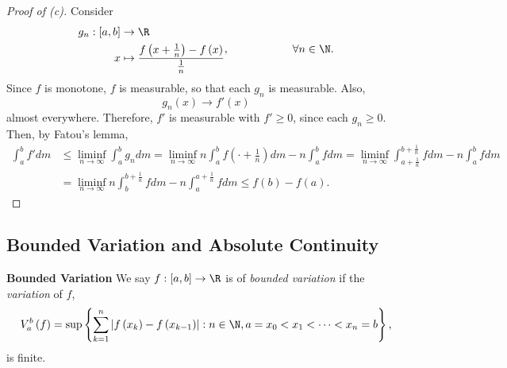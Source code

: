 \documentclass[pmath451]{subfiles}
\begin{document}
    \begin{proof}[Proof of (c)]
        Consider
        \begin{equation*}
            \begin{aligned}
                g_n:\left[ a,b \right]&\to\R \\
                x &\mapsto \frac{f\left( x+\frac{1}{n} \right)-f\left( x \right)}{\frac{1}{n}}
            \end{aligned} , \hspace{2cm}\forall n\in\N.
        \end{equation*}
        Since $f$ is monotone, $f$ is measurable, so that each $g_n$ is measurable. Also,
        \begin{equation*}
            g_n\left( x \right)\to f'\left( x \right)
        \end{equation*}
        almost everywhere. Therefore, $f'$ is measurable with $f'\geq 0$, since each $g_n\geq 0$. Then, by Fatou's lemma,
        \begin{equation*}
            \begin{aligned}
                \int^{b}_{a}f'dm & \leq \liminf_{n\to\infty}\int^{b}_{a}g_ndm = \liminf_{n\to\infty}n\int^{b}_{a}f\left( \cdot+\frac{1}{n} \right)dm-n\int^{b}_{a}fdm = \liminf_{n\to\infty} \int^{b+\frac{1}{n}}_{a+\frac{1}{n}} fdm - n\int^{b}_{a}fdm \\
                                 & = \liminf_{n\to\infty}n\int^{b+\frac{1}{n}}_{b}fdm - n\int^{a+\frac{1}{n}}_{a}fdm \leq f\left( b \right) - f\left( a \right).
            \end{aligned} 
        \end{equation*}
    \end{proof}
    
    \subsection{Bounded Variation and Absolute Continuity}

    \begin{definition}{\textbf{Bounded Variation}}
        We say $f:\left[ a,b \right]\to\R$ is of \emph{bounded variation} if the \emph{variation} of $f$,
        \begin{equation*}
            V^b_a\left( f \right) = \sup\left\lbrace \sum^{n}_{k=1} \left| f\left( x_k \right)-f\left( x_{k-1} \right) \right| : n\in\N, a=x_0<x_1<\cdots<x_n=b \right\rbrace,
        \end{equation*}
        is finite.
    \end{definition}
    
\end{document}
